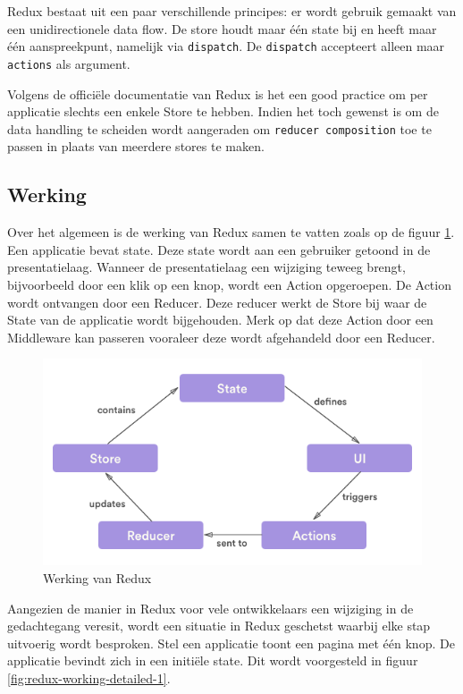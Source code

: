 Redux bestaat uit een paar verschillende principes: er wordt gebruik gemaakt van een unidirectionele data flow. De store houdt maar één state bij en heeft maar één aanspreekpunt, namelijk via \verb|dispatch|. De \verb|dispatch| accepteert alleen maar \verb|actions| als argument.

Volgens de officiële documentatie van Redux \autocite{Redux2019} is het een good practice om per applicatie slechts een enkele Store te hebben. Indien het toch gewenst is om de data handling te scheiden wordt aangeraden om \verb|reducer composition| toe te passen in plaats van meerdere stores te maken.

\subsection{Werking}
Over het algemeen is de werking van Redux samen te vatten zoals op de figuur \ref{fig:redux-working}. Een applicatie bevat state. Deze state wordt aan een gebruiker getoond in de presentatielaag. Wanneer de presentatielaag een wijziging teweeg brengt, bijvoorbeeld door een klik op een knop, wordt een Action opgeroepen. De Action wordt ontvangen door een Reducer. Deze reducer werkt de Store bij waar de State van de applicatie wordt bijgehouden. Merk op dat deze Action door een Middleware kan passeren vooraleer deze wordt afgehandeld door een Reducer.

\begin{figure}[H]
    \centering
    \includegraphics[width=\linewidth]{img/stand-van-zaken/redux-working.png}
    \caption{Werking van Redux \autocite{Tahir2018}}
    \label{fig:redux-working}
\end{figure}

Aangezien de manier in Redux voor vele ontwikkelaars een wijziging in de gedachtegang veresit, wordt een situatie in Redux geschetst waarbij elke stap uitvoerig wordt besproken.
Stel een applicatie toont een pagina met één knop. De applicatie bevindt zich in een initiële state. Dit wordt voorgesteld in figuur \ref{fig:redux-working-detailed-1}.

